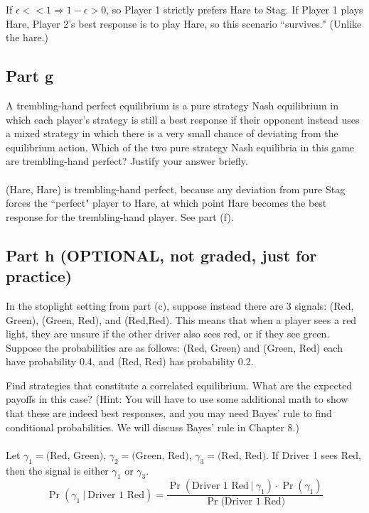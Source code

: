 \documentclass[10pt]{article}
\begin{document}
If $\epsilon << 1 \Longrightarrow 1 - \epsilon > 0$, so Player 1 strictly prefers Hare to Stag. If Player 1 plays Hare, Player 2's best response is to play Hare, so this scenario ``survives." (Unlike the hare.)
\newpage

\subsection*{Part g} A trembling-hand perfect equilibrium is a pure strategy Nash equilibrium in which each player's strategy is still a best response if their opponent instead uses a mixed strategy in which there is a very small chance of deviating from the equilibrium action. Which of the two pure strategy Nash equilibria in this game are trembling-hand perfect? Justify your answer briefly.
\\ \\ 
(Hare, Hare) is trembling-hand perfect, because any deviation from pure Stag forces the ``perfect" player to Hare, at which point Hare becomes the best response for the trembling-hand player. See part (f).

\newpage

\subsection*{Part h (OPTIONAL, not graded, just for practice)} In the stoplight setting from part (c), suppose instead there are 3 signals: (Red, Green), (Green, Red), and (Red,Red). This means that when a player sees a red light, they are unsure if the other driver also sees red, or if they see green. Suppose the probabilities are as follows: (Red, Green) and (Green, Red) each have probability 0.4, and (Red, Red) has probability 0.2.

Find strategies that constitute a correlated equilibrium. What are the expected payoffs in this case? (Hint: You will have to use some additional math to show that these are indeed best responses, and you may need Bayes' rule to find conditional probabilities. We will discuss Bayes' rule in Chapter 8.)
\\ \\
Let $\gamma_1 = \text{(Red, Green)}$, $\gamma_2 = \text{(Green, Red)}$, $\gamma_3 = \text{(Red, Red)}$. If Driver 1 sees Red, then the signal is either $\gamma_1$ or $\gamma_3$. \\
\[
\Pr(\gamma_1 \: | \: \text{Driver 1 Red}) = \frac{\Pr(\text{Driver 1 Red} \: | \: \gamma_1) \cdot \Pr(\gamma_1)}{\Pr(\text{Driver 1 Red)}}
\]
\end{document}
